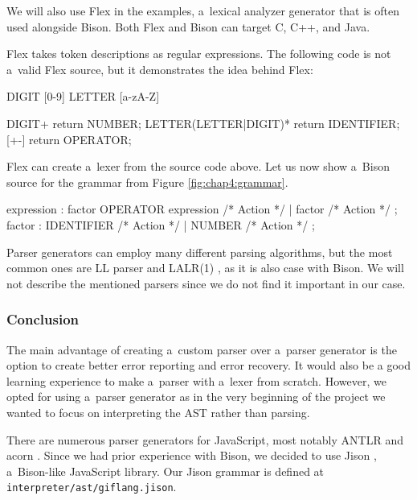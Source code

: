 We will also use Flex in the examples, a~lexical analyzer generator that is often used alongside Bison. Both Flex and Bison can target C, C++, and Java.

Flex takes token descriptions as regular expressions. The following code is not a~valid Flex source, but it demonstrates the idea behind Flex:
\begin{code}

DIGIT           [0-9]
LETTER          [a-zA-Z]

{DIGIT}+                        return NUMBER;
{LETTER}({LETTER}|{DIGIT})*     return IDENTIFIER;
[+-]                            return OPERATOR;
\end{code}

Flex can create a~lexer from the source code above. Let us now show a~Bison source for the grammar from Figure \ref{fig:chap4:grammar}.
\newpage
\begin{code}


expression
    : factor OPERATOR expression    { /* Action */ }
    | factor                        { /* Action */ }
    ;
factor
    : IDENTIFIER                    { /* Action */ }
    | NUMBER                        { /* Action */ }
    ;
\end{code}

Parser generators can employ many different parsing algorithms, but the most common ones are LL parser and LALR(1) \cite{aho_sethi_ullman_2002}, as it is also
case with Bison. We will not describe the mentioned parsers since we do not find it important in our case.

\subsubsection*{Conclusion}
The main advantage of creating a~custom parser over a~parser generator is the option to create better error reporting and error recovery. It would also be a
good learning experience to make a~parser with a~lexer from scratch. However, we opted for using a~parser generator as in the very beginning of the project
we wanted to focus on interpreting the AST rather than parsing.

There are numerous parser generators for JavaScript, most notably ANTLR \cite{ANTLR} and acorn \cite{acorn}. Since we had prior experience with Bison, we
decided to use Jison \cite{Jison}, a~Bison-like JavaScript library. Our Jison grammar is defined at \texttt{interpreter/ast/giflang.jison}.

